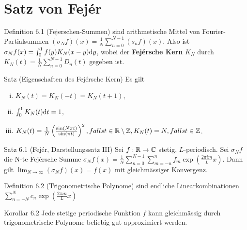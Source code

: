 \section{Satz von Fejér}

\begin{namedtheorem}{Definition 6.1 (Fejerschen-Summen)}
  sind arithmetische Mittel von Fourier-Partialsummen $(\sigma_Nf)(x) = \frac1N \sum_{n=0}^{N-1} (s_nf)(x)$. Also ist $\sigma_Nf(x) = \int_0^1 f(y)K_N(x-y)\mathrm{d} y$, wobei der \textbf{Fejérsche Kern} $K_N$ durch $K_N(t)=\frac1N \sum_{n=0}^{N-1}D_n(t)$ gegeben ist. 
\end{namedtheorem}

\begin{namedtheorem}{Satz (Eigenschaften des Fejérsche Kern)}
  Es gilt
  {\setlength\multicolsep{4pt}%
  \begin{multicols}{2}
    \begin{enumerate}[(i)]
      \item $K_N(t) = K_N(-t) = K_N(t+1)$,
      \item $\int_0^1 K_N(t)\mathrm{d} t = 1$,
    \end{enumerate}
  \end{multicols}}
  \begin{enumerate}[(i)]
    \setcounter{enumi}{2}
    \item $K_N(t) = \frac1N \left(\frac{\sin(N\pi t)}{\sin(\pi t)}\right)^2, falls t\in\mathbb{R}\setminus\mathbb{Z},
        K_N(t) = N , falls t\in \mathbb{Z}$.
  \end{enumerate}
\end{namedtheorem}

\begin{namedtheorem}{Satz 6.1 (Fejér, Darstellungssatz III)}
  Sei $f:\mathbb{R}\rightarrow\mathbb{C}$ stetig, $L$-periodisch. Sei $\sigma_Nf$ die N-te Fejérsche Summe $\sigma_Nf(x) = \frac1N \sum_{n=0}^{N-1}\sum_{m=-n}^{n} f_m \exp(\frac{2\pi im}{L} x)$. Dann gilt $\lim_{N\rightarrow\infty} (\sigma_Nf)(x) = f(x)$ mit gleichmässiger Konvergenz.
\end{namedtheorem}

\begin{namedtheorem}{Definition 6.2 (Trigonometrische Polynome)}
  sind endliche Linearkombinationen $\sum_{n=-N}^N c_n \exp(\frac{2\pi i n}L x)$
\end{namedtheorem}

\begin{namedtheorem}{Korollar 6.2}
  Jede stetige periodische Funktion $f$ kann gleichmässig durch trigonometrische Polynome beliebig gut approximiert werden.
\end{namedtheorem}

